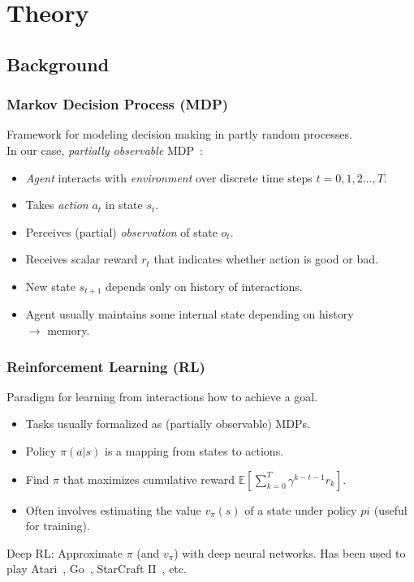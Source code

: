 \section{Theory}

\subsection{Background}

\begin{frame}
    \frametitle{Markov Decision Process (MDP)}
    
    Framework for modeling decision making in partly random processes.\\
    In our case, \textit{partially observable} MDP~\cite{kaelbling_planning_1998}:

    \begin{itemize}
        \item \textit{Agent} interacts with \textit{environment} over discrete time steps \(t = 0, 1, 2\dots, T\).
        \item Takes \textit{action} \(a_t\) in state \(s_t\).
        \item Perceives (partial) \textit{observation} of state \(o_t\).
        \item Receives scalar reward \(r_t\) that indicates whether action is good or bad.
        \item New state \(s_{t+1}\) depends only on history of interactions.
        \item Agent usually maintains some internal state depending on history \\
        \(\rightarrow\) memory.
    \end{itemize}

    \begin{figure}
        \centering
        \scalebox{0.75}{}
    \end{figure}
\end{frame}

\begin{frame}
    \frametitle{Reinforcement Learning (RL)}

    Paradigm for learning from interactions how to achieve a goal.

    \begin{itemize}
        \item Tasks usually formalized as (partially observable) MDPs.
        \item Policy \(\pi(a|s)\) is a mapping from states to actions.
        \item Find \(\pi\) that maximizes cumulative reward \(\mathbb{E} \left\lbrack \sum_{k=0}^{T} \gamma^{k-t-1} r_k \right\rbrack\).
        \item Often involves estimating the value \(v_\pi(s)\) of a state under policy \(pi\) (useful for training). 
    \end{itemize}

    Deep RL: Approximate \(\pi\) (and \(v_\pi\)) with deep neural networks.
    Has been used to play Atari~\cite{mnih_human-level_2015}, Go~\cite{silver_mastering_2016}, StarCraft II~\cite{vinyals_grandmaster_2019}, etc.

\end{frame}

